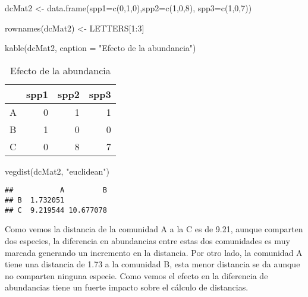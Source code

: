 \documentclass[
]{article}
\newenvironment{Shaded}{\begin{snugshade}}{\end{snugshade}}
\newcommand{\AttributeTok}[1]{\textcolor[rgb]{0.77,0.63,0.00}{#1}}
\newcommand{\DecValTok}[1]{\textcolor[rgb]{0.00,0.00,0.81}{#1}}
\newcommand{\FunctionTok}[1]{\textcolor[rgb]{0.00,0.00,0.00}{#1}}
\newcommand{\NormalTok}[1]{#1}
\newcommand{\OtherTok}[1]{\textcolor[rgb]{0.56,0.35,0.01}{#1}}
\newcommand{\SpecialCharTok}[1]{\textcolor[rgb]{0.00,0.00,0.00}{#1}}
\newcommand{\StringTok}[1]{\textcolor[rgb]{0.31,0.60,0.02}{#1}}
\begin{document}
\begin{Shaded}
\begin{Highlighting}[]
\NormalTok{dcMat2 }\OtherTok{\textless{}{-}} \FunctionTok{data.frame}\NormalTok{(}\AttributeTok{spp1=}\FunctionTok{c}\NormalTok{(}\DecValTok{0}\NormalTok{,}\DecValTok{1}\NormalTok{,}\DecValTok{0}\NormalTok{),}\AttributeTok{spp2=}\FunctionTok{c}\NormalTok{(}\DecValTok{1}\NormalTok{,}\DecValTok{0}\NormalTok{,}\DecValTok{8}\NormalTok{),}
                    \AttributeTok{spp3=}\FunctionTok{c}\NormalTok{(}\DecValTok{1}\NormalTok{,}\DecValTok{0}\NormalTok{,}\DecValTok{7}\NormalTok{))}

\FunctionTok{rownames}\NormalTok{(dcMat2) }\OtherTok{\textless{}{-}}\NormalTok{ LETTERS[}\DecValTok{1}\SpecialCharTok{:}\DecValTok{3}\NormalTok{]}

\FunctionTok{kable}\NormalTok{(dcMat2, }\AttributeTok{caption =} \StringTok{"Efecto de la abundancia"}\NormalTok{)}
\end{Highlighting}
\end{Shaded}

\begin{table}

\caption{\label{tab:unnamed-chunk-12}Efecto de la abundancia}
\centering
\begin{tabular}[t]{l|r|r|r}
\hline
  & spp1 & spp2 & spp3\\
\hline
A & 0 & 1 & 1\\
\hline
B & 1 & 0 & 0\\
\hline
C & 0 & 8 & 7\\
\hline
\end{tabular}
\end{table}

\begin{Shaded}
\begin{Highlighting}[]
\FunctionTok{vegdist}\NormalTok{(dcMat2, }\StringTok{"euclidean"}\NormalTok{)}
\end{Highlighting}
\end{Shaded}

\begin{verbatim}
##           A         B
## B  1.732051          
## C  9.219544 10.677078
\end{verbatim}

Como vemos la distancia de la comunidad A a la C es de 9.21, aunque comparten dos especies, la diferencia en abundancias entre estas dos comunidades es muy marcada generando un incremento en la distancia. Por otro lado, la comunidad A tiene una distancia de 1.73 a la comunidad B, esta menor distancia se da aunque no comparten ninguna especie. Como vemos el efecto en la diferencia de abundancias tiene un fuerte impacto sobre el cálculo de distancias.
\end{document}
